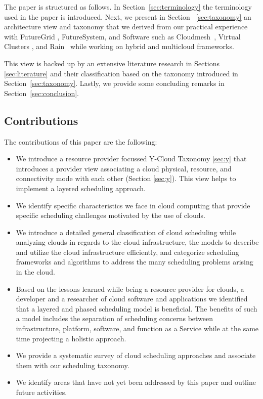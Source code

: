 \documentclass[final,5p,times,twocolumn]{elsarticle}
\begin{document}
The paper is structured as follows.  In Section~\ref{sec:terminology} the
terminology used in the paper is introduced. Next, we present in
Section ~\ref{sec:taxonomy} an architecture view and taxonomy that we
derived from our practical experience with FutureGrid
\cite{las12fg-bookchapter,fox2013futuregrid}, FutureSystem, and Software such as
Cloudmesh~\cite{von2014accessing}, Virtual Clusters \cite{las-comet}, and
Rain~\cite{las-fg-1295,las10dynamic,las-rain} while working on
hybrid and multicloud frameworks.

This view is backed up by an extensive literature research in Sections
\ref{sec:literature} and their classification based on the taxonomy
introduced in Section~\ref{sec:taxonomy}. Lastly, we provide some
concluding remarks in Section~\ref{sec:conclusion}.

\subsection{Contributions}

The contributions of this paper are the following:

\begin{itemize}

\item We introduce a resource provider focussed Y-Cloud Taxonomy
  \ref{sec:y} that introduces a provider view associating a cloud
  physical, resource, and connectivity mode with each other (Section
  \ref{sec:y}). This view helps to implement a layered scheduling
  approach.

\item We identify specific characteristics we face in cloud computing
  that provide specific scheduling challenges motivated by the use of clouds.

\item We introduce a detailed general classification of cloud
  scheduling while analyzing clouds in regards to the cloud 
  infrastructure, the models to describe and utilize the cloud infrastructure
  efficiently, and categorize scheduling frameworks and algorithms to
  address the many scheduling problems arising in the cloud.

\item Based on the lessons learned while being a resource provider for
  clouds, a developer and a researcher of cloud software and
  applications we identified that a layered and phased scheduling
  model is beneficial. The benefits of such a model includes the
  separation of scheduling concerns between infrastructure, platform, software,
  and function as a Service while at the same time projecting a
  holistic approach.

\item We provide a systematic survey of cloud scheduling approaches
  and associate them with our scheduling taxonomy.

\item We identify areas that have not yet been addressed by this paper
  and outline future activities.

\end{itemize}
\end{document}
